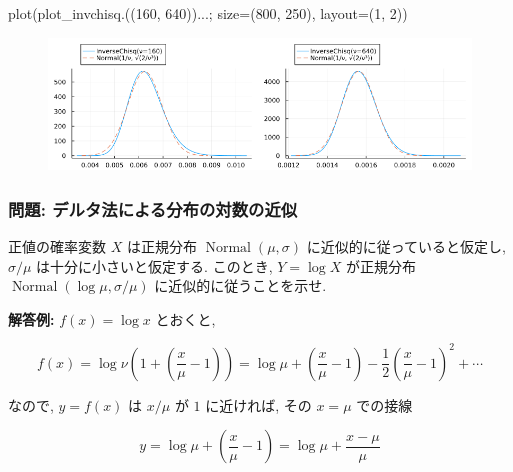 \documentclass[
  letterpaper,
  DIV=11,
  numbers=noendperiod]{scrartcl}
\newenvironment{Shaded}{\begin{snugshade}}{\end{snugshade}}
\newcommand{\FloatTok}[1]{\textcolor[rgb]{0.68,0.00,0.00}{#1}}
\newcommand{\FunctionTok}[1]{\textcolor[rgb]{0.28,0.35,0.67}{#1}}
\newcommand{\NormalTok}[1]{\textcolor[rgb]{0.00,0.23,0.31}{#1}}
\newcommand{\OperatorTok}[1]{\textcolor[rgb]{0.37,0.37,0.37}{#1}}
\begin{document}
\begin{Shaded}
\begin{Highlighting}[]
\FunctionTok{plot}\NormalTok{(}\FunctionTok{plot\_invchisq}\NormalTok{.((}\FloatTok{160}\NormalTok{, }\FloatTok{640}\NormalTok{))}\OperatorTok{...}\NormalTok{; size}\OperatorTok{=}\NormalTok{(}\FloatTok{800}\NormalTok{, }\FloatTok{250}\NormalTok{), layout}\OperatorTok{=}\NormalTok{(}\FloatTok{1}\NormalTok{, }\FloatTok{2}\NormalTok{))}
\end{Highlighting}
\end{Shaded}

\begin{figure}[H]

{\centering \includegraphics{05 Central limit theorem_files/figure-pdf/cell-103-output-1.png}

}

\end{figure}

\hypertarget{ux554fux984c-ux30c7ux30ebux30bfux6cd5ux306bux3088ux308bux5206ux5e03ux306eux5bfeux6570ux306eux8fd1ux4f3c}{%
\subsubsection{問題:
デルタ法による分布の対数の近似}\label{ux554fux984c-ux30c7ux30ebux30bfux6cd5ux306bux3088ux308bux5206ux5e03ux306eux5bfeux6570ux306eux8fd1ux4f3c}}

正値の確率変数 \(X\) は正規分布 \(\operatorname{Normal}(\mu, \sigma)\)
に近似的に従っていると仮定し, \(\sigma/\mu\) は十分に小さいと仮定する.
このとき, \(Y = \log X\) が正規分布
\(\operatorname{Normal}(\log \mu, \sigma/\mu)\)
に近似的に従うことを示せ.

\textbf{解答例:} \(f(x)=\log x\) とおくと,

\[
f(x) = \log\nu\left(1 + \left(\frac{x}{\mu}-1\right)\right) =
\log\mu + \left(\frac{x}{\mu}-1\right) - \frac{1}{2}\left(\frac{x}{\mu}-1\right)^2 + \cdots
\]

なので, \(y = f(x)\) は \(x/\mu\) が \(1\) に近ければ, その \(x=\mu\)
での接線

\[
y = \log\mu + \left(\frac{x}{\mu}-1\right) =
\log\mu + \frac{x-\mu}{\mu}
\]
\end{document}
